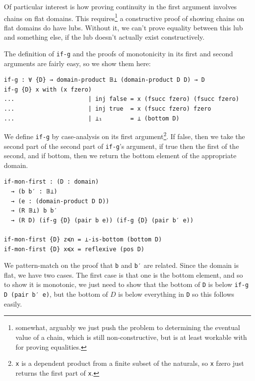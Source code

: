 \documentclass[12pt,a4paper,twoside,openright]{report}
\begin{document}
Of particular interest is how proving continuity in the first argument involves chains on flat domains. This requires\footnote{somewhat, arguably we just push the problem to determining the eventual value of a chain, which is still non-constructive, but is at least workable with for proving equalities.} a constructive proof of showing chains on flat domains do have lubs. Without it, we can't prove equality between this lub and something else, if the lub doesn't actually exist constructively. 

The definition of \texttt{if-g} and the proofs of monotonicity in its first and second arguments are fairly easy, so we show them here:
\begin{verbatim}
if-g : ∀ {D} → domain-product 𝔹⊥ (domain-product D D) → D
if-g {D} x with (x fzero)
...                     | inj false = x (fsucc fzero) (fsucc fzero)
...                     | inj true  = x (fsucc fzero) fzero
...                     | ⊥₁        = ⊥ (bottom D)
\end{verbatim}
We define \texttt{if-g} by case-analysis on its first argument\footnote{\texttt{x} is a dependent product from a finite subset of the naturals, so \texttt{x} fzero just returns the first part of \texttt{x}.}. If false, then we take the second part of the second part of \texttt{if-g}'s argument, if true then the first of the second, and if bottom, then we return the bottom element of the appropriate domain. 
\begin{verbatim}
if-mon-first : (D : domain)
  → (b b′ : 𝔹⊥)
  → (e : (domain-product D D))
  → (R 𝔹⊥) b b′
  → (R D) (if-g {D} (pair b e)) (if-g {D} (pair b′ e))

if-mon-first {D} z≼n = ⊥-is-bottom (bottom D)
if-mon-first {D} x≼x = reflexive (pos D)
\end{verbatim}
We pattern-match on the proof that \texttt{b} and \texttt{b′} are related. Since the domain is flat, we have two cases. The first case is that one is the bottom element, and so to show it is monotonic, we just need to show that the bottom of \texttt{D} is below \texttt{if-g {D} (pair b′ e)}, but the bottom of $D$ is below everything in \texttt{D} so this follows easily.
\end{document}
